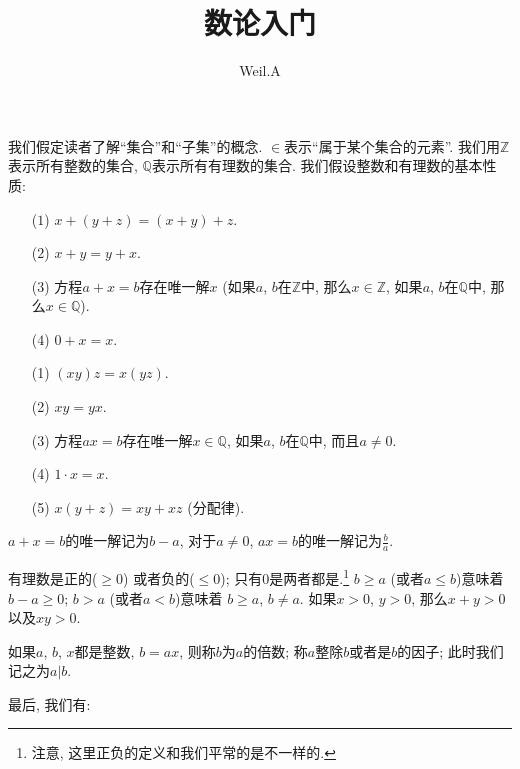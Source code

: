 \documentclass[12pt,a4paper]{book} %
\theoremstyle{remark}
\theoremstyle{example}
\theoremstyle{lemma}
\theoremstyle{corollary}
\numberwithin{theorem}{chapter}
\begin{document}
\title{数论入门}
\author{Weil.A}
\maketitle

\chapter{} \label{chapter:1}
我们假定读者了解``集合''和``子集''的概念. $\in$表示``属于某个集合的元素''. 我们用$\mathbb{Z}$表示所有整数的集合, $\mathbb{Q}$表示所有有理数的集合. 我们假设整数和有理数的基本性质:
\begin{enumerate}
\item[($1$)] $x + (y + z) = (x + y) + z$.

\item[($2$)] $x + y = y + x$.

\item[($3$)] 方程$a + x = b$存在唯一解$x$ (如果$a$, $b$在$\mathbb{Z}$中, 那么$x \in \mathbb{Z}$, 如果$a$, $b$在$\mathbb{Q}$中, 那么$x \in \mathbb{Q}$).

\item[($4$)] $0 + x = x$.

\item[(1\textquotesingle)] $(xy)z = x(yz)$.

\item[(2\textquotesingle)] $xy = yx$.

\item[(3\textquotesingle)] 方程$ax = b$存在唯一解$x \in \mathbb{Q}$, 如果$a$, $b$在$\mathbb{Q}$中, 而且$a \neq 0$.

\item[(4\textquotesingle)] $1 \cdot x = x$.

\item[(5)] $x(y + z) = xy + xz$ (分配律).
\end{enumerate}

$a + x = b$的唯一解记为$b - a$, 对于$a \neq 0$, $ax = b$的唯一解记为$\frac{b}{a}$.

有理数是正的($\ge 0$) 或者负的($\le 0$); 只有$0$是两者都是.\footnote{注意, 这里正负的定义和我们平常的是不一样的.} $b \ge a$ (或者$a \le b$)意味着$b - a \ge 0$; $b > a$ (或者$a < b$)意味着 $b \ge a$, $b \neq a$. 如果$x > 0$, $y > 0$, 那么$x + y > 0$以及$xy > 0$.

如果$a$, $b$, $x$都是整数, $b = ax$, 则称$b$为$a$的倍数; 称$a$整除$b$或者是$b$的因子; 此时我们记之为$a | b$.

最后, 我们有:
\end{document}
